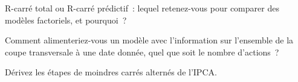\begin{interviewq}\label{iq:ml:cross-sectional-deep-models:4}
R-carré total ou R-carré prédictif~: lequel retenez-vous pour comparer des modèles factoriels, et pourquoi~?
\end{interviewq}

\begin{interviewq}\label{iq:ml:cross-sectional-deep-models:5}
Comment alimenteriez-vous un modèle avec l'information sur l'ensemble de la coupe transversale à une date donnée, quel que soit le nombre d'actions~?
\end{interviewq}

\begin{interviewq}\label{iq:ml:cross-sectional-deep-models:6}
Dérivez les étapes de moindres carrés alternés de l'IPCA.
\end{interviewq}
